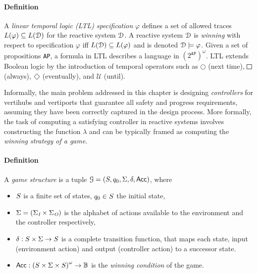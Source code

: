 \paragraph*{\textbf{Definition}}
%
A \emph{linear temporal logic (LTL) specification} $\varphi$ defines a set of allowed traces $L(\varphi) \subseteq L(\mathcal{D})$ for the reactive system $\mathcal{D}$.  A reactive system $\mathcal{D}$ is \emph{winning} with respect to specification $\varphi$ iff $L(\mathcal{D}) \subseteq L(\varphi)$ and is denoted $\mathcal{D} \models \varphi$. Given a set of propositions \texttt{AP}, a formula in LTL describes a language in $(2^{\texttt{AP}})^\omega$. LTL extends Boolean logic by the introduction of temporal operators such as $\bigcirc$ (next time), $\LTLglobally$ (always), $\LTLfinally$ (eventually), and $\mathcal{U}$ (until). 


 Informally, the main problem addressed in this chapter is designing \emph{controllers} for vertihubs and vertiports that guarantee all safety and progress requirements, assuming they have been correctly captured in the design process. More formally, the task of computing a satisfying controller in reactive systems involves constructing the function $\lambda$ and can be typically framed as computing the \emph{winning strategy of a game}. 



\paragraph*{\textbf{Definition}}
%
A \emph{game structure} is a tuple 
$\mathcal{G} = (S, q_0, \Sigma, \delta,\mathsf{Acc})$,
where 
\begin{itemize}
\item $S$ is a finite set of states, $q_0 \in S$ the initial state,
\item $\Sigma = (\Sigma_{\textit{I}} \times \Sigma_{\textit{O}})$ is the alphabet of actions available to the environment and the controller respectively, 
\item $\delta: S \times \Sigma \rightarrow S$
is a complete transition function, that maps each state, input (environment action) and output (controller action) to a successor state.
\item $\mathsf{Acc}: \left(S \times \Sigma \times S\right)^\omega \rightarrow \mathbb{B}$ is the \emph{winning condition} of the game. 
\end{itemize}


